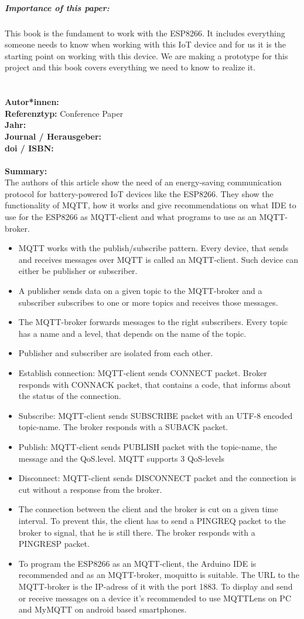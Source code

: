 \documentclass{report}
\newcommand{\createConferencePaperHeader}[1]{
    {\let\clearpage\relax \chapter{\citetitle{#1}}}
    \noindent
    \textbf{Autor*innen:} \citeauthor{#1} \\
    \textbf{Referenztyp:} Conference Paper\\
    \textbf{Jahr:} \citeyear{#1} \\
    \textbf{Journal / Herausgeber:} \citelist{#1}{publisher}\\
    \textbf{doi / ISBN:} \citefield{#1}{doi} \\\\
    \textbf{Summary:}\\
}
\begin{document}
\paragraph{Importance of this paper:} This book is the fundament to work with the ESP8266. It includes everything someone needs to know when working with this IoT device and for us it is the starting point on working with this device. We are making a prototype for this project and this book covers everything we need to know to realize it.


\createConferencePaperHeader{kodali_mqtt_2016}
The authors of this article show the need of an energy-saving communication protocol for battery-powered IoT devices like the ESP8266.
They show the functionality of MQTT, how it works and give recommendations on what IDE to use for the ESP8266 as MQTT-client and what programs to use as an MQTT-broker.\\
\begin{itemize}
    \item MQTT works with the publish/subscribe pattern. Every device, that sends and receives messages over MQTT is called an MQTT-client. Such device can either be publisher or subscriber.
    \item A publisher sends data on a given topic to the MQTT-broker and a subscriber subscribes to one or more topics and receives those messages.
    \item The MQTT-broker forwards messages to the right subscribers. Every topic has a name and a level, that depends on the name of the topic.
    \item Publisher and subscriber are isolated from each other.
    \item Establish connection: MQTT-client sends CONNECT packet. Broker responds with CONNACK packet, that contains a code, that informs about the status of the connection.
    \item Subscribe: MQTT-client sends SUBSCRIBE packet with an UTF-8 encoded topic-name. The broker responds with a SUBACK packet.
    \item Publish: MQTT-client sends PUBLISH packet with the topic-name, the message and the QoS.level. MQTT supports 3 QoS-levels
    \item Disconnect: MQTT-client sends DISCONNECT packet and the connection is cut without a response from the broker.
    \item The connection between the client and the broker is cut on a given time interval. To prevent this, the client has to send a PINGREQ packet to the broker to signal, that he is still there. The broker responds with a PINGRESP packet.
    \item To program the ESP8266 as an MQTT-client, the Arduino IDE is recommended and as an MQTT-broker, moquitto is suitable. The URL to the MQTT-broker is the IP-adress of it with the port 1883. To display and send or receive messages on a device it's recommended to use MQTTLens on PC and MyMQTT on android  based smartphones.
\end{itemize}
\end{document}
